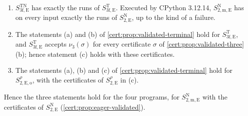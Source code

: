 \begin{proposition}\label{cert:prop:eager-three}
\begin{enumerate}[label=(\alph*)]
\item $S^{\mathrm{TN}}_{3\mathrm f,\mathrm E}$ has exactly the runs of
$S^{\mathrm T}_{3\mathrm f,\mathrm E}$. Executed by CPython 3.12.14,
$S^{\mathrm N}_{2,\mathrm{m,E}}$ has on every input exactly the runs of
$S^{\mathrm N}_{2,\mathrm E}$, up to the kind of a failure.
\item The statements (a) and (b) of \cref{cert:prop:validated-terminal} hold for
$S^{\mathrm T}_{3\mathrm f,\mathrm E}$, and $S^{\mathrm T}_{3\mathrm f,\mathrm E}$
accepts $\nu_3(\sigma)$ for every certificate $\sigma$ of
\cref{cert:prop:validated-three}(b); hence statement (c) holds with these
certificates.
\item The statements (a), (b) and (c) of \cref{cert:prop:validated-terminal} hold
for $S^{\rho}_{2,\mathrm{E,o}}$, with the certificates of $S^{\rho}_{2,\mathrm E}$ in
(c).
\end{enumerate}
Hence the three statements hold for the four programs, for
$S^{\mathrm N}_{2,\mathrm{m,E}}$ with the certificates of
$S^{\mathrm N}_{2,\mathrm E}$ (\cref{cert:prop:eager-validated}).
\end{proposition}
